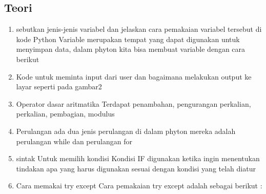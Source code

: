\subsection{Teori}
\begin{enumerate}

\item sebutkan jenis-jenis variabel dan jelaskan cara pemakaian variabel tersebut di kode Python
Variable merupakan tempat yang dapat digunakan untuk menyimpan data, dalam phyton kita bisa membuat variable dengan cara berikut


\item Kode untuk meminta input dari user dan bagaimana melakukan output ke layar seperti pada gambar2


\item Operator dasar aritmatika
Terdapat penambahan, pengurangan perkalian, perkalian, pembagian, modulus



\item Perulangan
ada dua jenis perulangan di dalam phyton mereka adalah perulangan while dan perulangan for


\item sintak Untuk memilih kondisi
Kondisi IF digunakan ketika ingin menentukan tindakan apa yang harus digunakan sesuai dengan kondisi yang telah diatur


\item Cara memakai try except
Cara pemakaian try except adalah sebagai berikut :
    


\end{enumerate}

